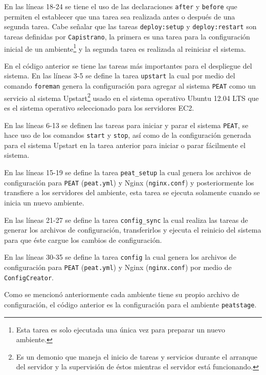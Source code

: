 En las líneas 18-24 se tiene el uso de las declaraciones \texttt{after}
y \texttt{before} que permiten el establecer que una tarea sea realizada
antes o después de una segunda tarea. Cabe señalar que las tareas
\texttt{deploy:setup} y \texttt{deploy:restart} son tareas definidas
por \texttt{Capistrano}, la primera es una tarea para la configuración inicial
de un ambiente\footnote{Esta tarea es solo ejecutada una única vez para preparar
  un nuevo ambiente.} y la segunda tarea es realizada al reiniciar el sistema.



En el código anterior se tiene las tareas más importantes para el
despliegue del sistema. En las líneas 3-5 se define la tarea \texttt{upstart}
la cual por medio del comando \texttt{foreman} genera la configuración para agregar
al sistema \texttt{PEAT} como un servicio al sistema Upstart\footnote{Es un demonio
  que maneja el inicio de tareas y servicios durante el arranque del servidor y la
  supervisión de éstos mientras el servidor está funcionando.} usado en el sistema
operativo Ubuntu 12.04 LTS que es el sistema operativo seleccionado para los
servidores EC2.

En las líneas 6-13 se definen las tareas para iniciar y parar el sistema
\texttt{PEAT}, se hace uso de los comandos \texttt{start} y \texttt{stop}, así como
de la configuración generada para el sistema Upstart en la tarea anterior para
iniciar o parar fácilmente el sistema.

En las líneas 15-19 se define la tarea \texttt{peat\_setup} la cual genera
los archivos de configuración para \texttt{PEAT} (\texttt{peat.yml}) y
Nginx (\texttt{nginx.conf}) y posteriormente los transfiere a los servidores
del ambiente, esta tarea se ejecuta solamente cuando se inicia un nuevo
ambiente.

En las líneas 21-27 se define la tarea \texttt{config\_sync} la cual
realiza las tareas de generar los archivos de configuración, transferirlos y
ejecuta el reinicio del sistema para que éste cargue los cambios de configuración.

En las líneas 30-35 se define la tarea \texttt{config} la cual genera
los archivos de configuración para \texttt{PEAT} (\texttt{peat.yml}) y
Nginx (\texttt{nginx.conf}) por medio de \texttt{ConfigCreator}.



Como se mencionó anteriormente cada ambiente tiene su propio archivo de
configuración, el código anterior es la configuración para el ambiente
\texttt{peatstage}.

